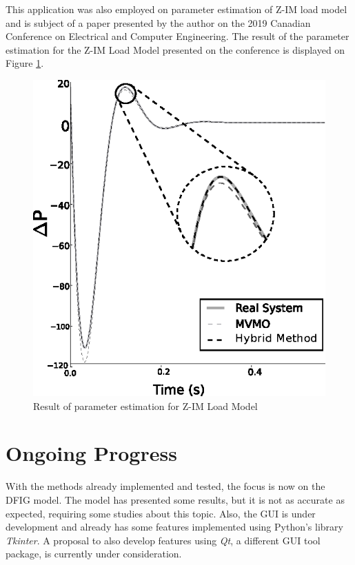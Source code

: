 This application was also employed on parameter estimation of Z-IM load model and is subject of a paper presented by the author on the 2019 Canadian Conference on Electrical and Computer Engineering. The result of the parameter estimation for the Z-IM Load Model presented on the conference is displayed on Figure \ref{fig: ZIM}.

\begin{figure}[h]
	\caption{Result of parameter estimation for Z-IM Load Model}
	\begin{center}
		\includegraphics[scale=1]{Images/ZIM.eps}
	\end{center}
	\label{fig: ZIM}
\end{figure}

\section{Ongoing Progress}

With the methods already implemented and tested, the focus is now on the DFIG model. The model has presented some results, but it is not as accurate as expected, requiring some studies about this topic. Also, the GUI is under development and already has some features implemented using Python's library \textit{Tkinter}. A proposal to also develop features using \textit{Qt}, a different GUI tool package, is currently under consideration.